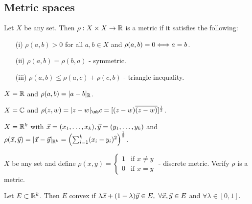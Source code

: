 \documentclass[]{article}
\begin{document}
\subsection{Metric spaces}

\begin{definition}
	[Metric] Let $X$ be any set. Then $\rho:X\times X\rightarrow \mathbb{R}$ is a metric if it satisfies the following:
	\begin{enumerate}
		\item[(i)] $\rho(a,b)>0$ for all $a,b\in X$ and $\rho(a,b) = 0 \Longleftrightarrow a= b$.
		\item[(ii)] $\rho(a,b) = \rho(b,a)$ - symmetric.
		\item[(iii)] $\rho(a,b)\leq \rho(a,c) + \rho(c,b)$ - triangle inequality.
	\end{enumerate}
\end{definition}
\begin{example}
	$X = \mathbb{R}$ and $\rho(a,b) = |a-b|_{\mathbb{R}}$.
\end{example}
\begin{example}
	$X = \mathbb{C}$ and $\rho(z,w) = |z-w|_\mb c = [(z-w)\conj{(z-w)}]^{\frac{1}{2}}$.
\end{example}
\begin{example}
	$X = \mathbb{R}^k$ with $\vec{x} = (x_1,\dots,x_k),\vec{y} = (y_1,\dots,y_k)$ and $\rho(\vec{x},\vec{y}) = |\vec{x} - \vec{y}|_{\mathbb{R}^k} = \left( \sum_{i=1}^k (x_i-y_i)^2 \right)^{\frac{1}{2}}$.
\end{example}
\begin{example}
	$X$ be any set and define $\rho(x,y) = \begin{cases} 1 & \text{if } x\neq y \\ 0 & \text{if } x = y \end{cases}$ - discrete metric. Verify $\rho$ is a metric.
\end{example}
\begin{definition}
	 Let $E\subset\mathbb{R}^k$. Then $E$ convex if $\lambda\vx + (1-\lambda)\vy \in E,\ \forall\vx,\vy\in E$ and $\forall \lambda\in[0,1]$.
\end{definition}
\end{document}
